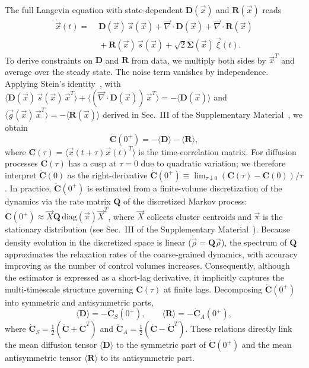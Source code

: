 \documentclass[%
  prl,
  reprint,
  amsmath,
  amssymb,
  aps
]{revtex4-2}
\newcommand{\vvec}[1]{\vec{#1}}
\begin{document}
The full Langevin equation with state-dependent $\bm{D}(\vvec{x})$ and $\bm{R}(\vvec{x})$ reads
\begin{equation}
\label{eq:langevin_full}
\begin{aligned}
\dot{\vvec{x}}(t)
=&\; \bm{D}(\vvec{x})\,\vvec{s}(\vvec{x})
  + \vvec{\nabla} \cdot \bm{D}(\vvec{x})
  + \vvec{\nabla} \cdot \bm{R}(\vvec{x}) \\
&\; + \bm{R}(\vvec{x})\,\vvec{s}(\vvec{x})
  + \sqrt{2}\bm{\Sigma}(\vvec{x})\,\vvec{\xi}(t).
\end{aligned}
\end{equation}
To derive constraints on $\bm{D}$ and $\bm{R}$ from data, we multiply both sides by $\vvec{x}^T$ and average over the steady state. The noise term vanishes by independence. Applying Stein's identity~\cite{stein1981estimation}, with $\langle \bm{D}(\vvec{x})\,\vvec{s}(\vvec{x})\,\vvec{x}^T \rangle + \langle (\vvec{\nabla}\cdot\bm{D}(\vvec{x}))\,\vvec{x}^T \rangle = -\langle \bm{D}(\vvec{x}) \rangle$ and $\langle \vvec{g}(\vvec{x})\,\vvec{x}^T \rangle = -\langle \bm{R}(\vvec{x}) \rangle$ derived in Sec.~III of the Supplementary Material~\cite{SM}, we obtain
\begin{equation}
\label{eq:Cdot_decomposition}
\dot{\bm{C}}(0^+) = -\langle \bm{D} \rangle - \langle \bm{R} \rangle,
\end{equation}
where $\bm{C}(\tau) = \langle \vvec{x}(t+\tau) \vvec{x}(t)^T \rangle$ is the time-correlation matrix. For diffusion processes $\bm{C}(\tau)$ has a cusp at $\tau=0$ due to quadratic variation; we therefore interpret $\dot{\bm{C}}(0)$ as the right-derivative $\dot{\bm{C}}(0^+)\equiv \lim_{\tau\downarrow 0}(\bm{C}(\tau)-\bm{C}(0))/\tau$. In practice, $\dot{\bm{C}}(0^+)$ is estimated from a finite-volume discretization of the dynamics via the rate matrix $\bm{Q}$ of the discretized Markov process: $\dot{\bm{C}}(0^+)\approx \vvec{X}\bm{Q}\,\mathrm{diag}(\vvec{\pi})\vvec{X}^T$, where $\vvec{X}$ collects cluster centroids and $\vvec{\pi}$ is the stationary distribution (see Sec.~III of the Supplementary Material~\cite{SM}). Because density evolution in the discretized space is linear ($\dot{\vvec{\rho}}=\bm{Q}\vvec{\rho}$), the spectrum of $\bm{Q}$ approximates the relaxation rates of the coarse-grained dynamics, with accuracy improving as the number of control volumes increases. Consequently, although the estimator is expressed as a short-lag derivative, it implicitly captures the multi-timescale structure governing $\bm{C}(\tau)$ at finite lags. Decomposing $\dot{\bm{C}}(0^+)$ into symmetric and antisymmetric parts,
\begin{equation}
\label{eq:diffusion_constraint}
\langle \bm{D} \rangle = -\dot{\bm{C}}_S(0^+), \qquad \langle \bm{R} \rangle = -\dot{\bm{C}}_A(0^+),
\end{equation}
where $\dot{\bm{C}}_S = \tfrac{1}{2}(\dot{\bm{C}} + \dot{\bm{C}}^T)$ and $\dot{\bm{C}}_A = \tfrac{1}{2}(\dot{\bm{C}} - \dot{\bm{C}}^T)$. These relations directly link the mean diffusion tensor $\langle \bm{D} \rangle$ to the symmetric part of $\dot{\bm{C}}(0^+)$ and the mean antisymmetric tensor $\langle \bm{R} \rangle$ to its antisymmetric part.
\end{document}
